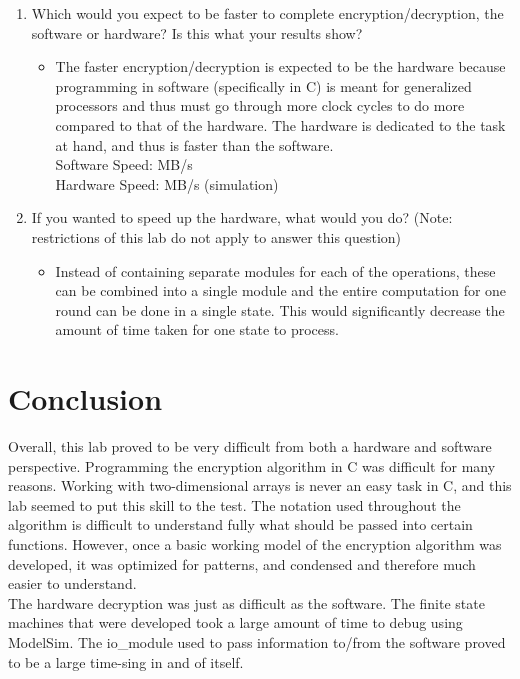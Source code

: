 \documentclass[journal, twocolumn, final,11pt,letterpaper]{IEEEtran}
\begin{document}
\begin{enumerate}
	\item Which would you expect to be faster to complete encryption/decryption, the software or hardware? Is this what your results show?
	\begin{itemize}
		\item The faster encryption/decryption is expected to be the hardware because programming in software (specifically in C) is meant for generalized processors and thus must go through more clock cycles to do more compared to that of the hardware. The hardware is dedicated to the task at hand, and thus is faster than the software. \\
		
			\setlength{\leftskip}{24pt}Software Speed: MB/s \\
			Hardware Speed: MB/s (simulation)\\
			
	\end{itemize}
	\item If you wanted to speed up the hardware, what would you do? (Note: restrictions of this lab do not apply to answer this question)
	\begin{itemize}
		\item Instead of containing separate modules for each of the operations, these can be combined into a single module and the entire computation for one round can be done in a single state. This would significantly decrease the amount of time taken for one state to process. 
	\end{itemize}
\end{enumerate}


\section{Conclusion}
Overall, this lab proved to be very difficult from both a hardware and software perspective. Programming the encryption algorithm in C was difficult for many reasons. Working with two-dimensional arrays is never an easy task in C, and this lab seemed to put this skill to the test. The notation used throughout the algorithm is difficult to understand fully what should be passed into certain functions. However, once a basic working model of the encryption algorithm was developed, it was optimized for patterns, and condensed and therefore much easier to understand. \\

The hardware decryption was just as difficult as the software. The finite state machines that were developed took a large amount of time to debug using ModelSim. The io\_module used to pass information to/from the software proved to be a large time-sing in and of itself. \\
\end{document}
